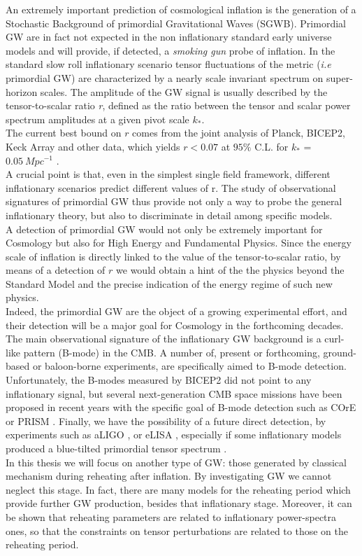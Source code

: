 \documentclass[11pt,a4paper,twoside]{book}
\begin{document}
An extremely important prediction of cosmological inflation is the generation of a Stochastic Background of primordial Gravitational Waves (SGWB). Primordial GW are in fact not expected in the non inflationary standard early universe models and will provide, if detected, a \textit{smoking gun} probe of inflation. In the standard slow roll inflationary scenario tensor fluctuations of the metric (\textit{i.e} primordial GW) are characterized by a nearly scale invariant spectrum on super-horizon scales. The amplitude of the GW signal is usually described by the tensor-to-scalar ratio \textit{r}, defined as the ratio between the tensor and scalar power spectrum amplitudes at a given pivot scale $ k_{*} $.\\
The current best bound on $ \textit{r} $ comes from the joint analysis of Planck, BICEP2, Keck Array and other data, which yields $ r < 0.07 $ at $ 95 \% $ C.L. for $ k_{*}$ = $ 0.05\ Mpc^{-1} $ \cite{Bicep2:Intro}. \\
A crucial point is that, even in the simplest single field framework, different inflationary scenarios predict different values of r. The study of observational signatures of primordial GW thus provide not only a way to probe the general inflationary theory, but also to discriminate in detail among specific models.\\
A detection of primordial GW would not only be extremely important for Cosmology but also for High Energy and Fundamental Physics. Since the energy scale of inflation is directly linked to the value of the tensor-to-scalar ratio, by means of a detection of $ r $ we would obtain a hint of the the physics beyond the Standard Model and the precise indication of the energy regime of such new physics.\\
Indeed, the primordial GW are the object of a growing experimental effort, and their detection will be a major goal for Cosmology in the forthcoming  decades. \\
The main observational signature of the inflationary GW background is a curl-like pattern (B-mode) in the CMB. A number of, present or forthcoming, ground-based or baloon-borne experiments, are specifically aimed to B-mode detection. Unfortunately, the B-modes measured by BICEP2 \cite{Bicep2BMode:Intro} did not point to any inflationary signal, but several next-generation CMB space missions have been proposed in recent years with the specific goal of B-mode detection such as COrE \cite{COre:intro} or PRISM \cite{PRISM:intro}. 
Finally, we have the possibility of a future direct detection, by experiments such as aLIGO \cite{LIGO:intro}, or eLISA \cite{Lisa:Intro}, especially if some inflationary models produced a blue-tilted primordial tensor spectrum \cite{GWFromInflation:Intro}.\\
In this thesis we will focus on another type of GW: those generated by classical mechanism during reheating after inflation. By investigating  GW we cannot neglect this stage. In fact, there are many models for the reheating period which provide further GW production, besides that inflationary stage. Moreover, it can be shown that reheating parameters are related to inflationary power-spectra ones, so that the constraints on tensor perturbations are related to those on the reheating period.
\end{document}
